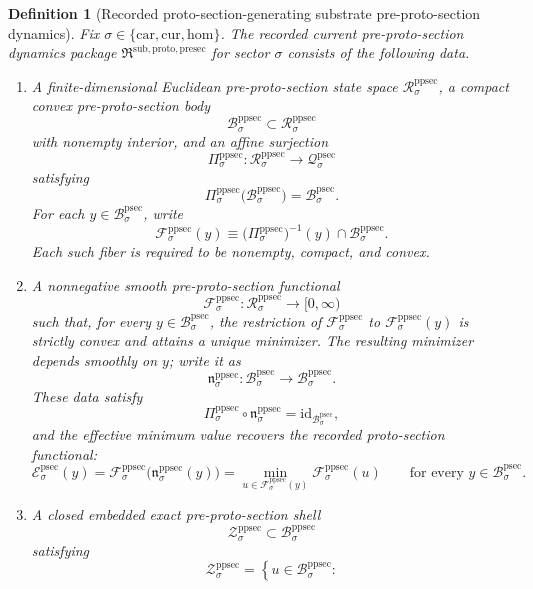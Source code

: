 \documentclass[11pt]{article}
\newcommand{\Car}{\mathrm{car}}
\newcommand{\Cur}{\mathrm{cur}}
\newcommand{\Hom}{\mathrm{hom}}
\newcommand{\ProtoSectionState}[1]{\mathcal Q_{#1}^{\mathrm{psec}}}
\newcommand{\ProtoSectionBody}[1]{\mathcal B_{#1}^{\mathrm{psec}}}
\newcommand{\ProtoSectionFunctional}[1]{\mathscr E_{#1}^{\mathrm{psec}}}
\newcommand{\PreProtoSectionPackage}{\mathfrak R^{\mathrm{sub,proto,presec}}}
\newcommand{\PreProtoSectionState}[1]{\mathcal R_{#1}^{\mathrm{ppsec}}}
\newcommand{\PreProtoSectionBody}[1]{\mathcal B_{#1}^{\mathrm{ppsec}}}
\newcommand{\PreProtoSectionProj}[1]{\Pi_{#1}^{\mathrm{ppsec}}}
\newcommand{\PreProtoSectionFiber}[2]{\mathcal F_{#1}^{\mathrm{ppsec}}(#2)}
\newcommand{\PreProtoSectionProtoMin}[1]{\mathfrak n_{#1}^{\mathrm{ppsec}}}
\newcommand{\PreProtoSectionFunctional}[1]{\mathscr F_{#1}^{\mathrm{ppsec}}}
\newcommand{\PreProtoSectionShell}[1]{\mathcal Z_{#1}^{\mathrm{ppsec}}}
\newtheorem{definition}{Definition}
\begin{document}
\begin{definition}[Recorded proto-section-generating substrate pre-proto-section dynamics]
\label{def:preprotosec}
Fix \(\sigma\in\{\Car,\Cur,\Hom\}\). The recorded current pre-proto-section dynamics package \(\PreProtoSectionPackage\) for sector \(\sigma\) consists of the following data.
\begin{enumerate}
    \item A finite-dimensional Euclidean pre-proto-section state space \(\PreProtoSectionState{\sigma}\), a compact convex pre-proto-section body
    \[
    \PreProtoSectionBody{\sigma}\subset\PreProtoSectionState{\sigma}
    \]
    with nonempty interior, and an affine surjection
    \[
    \PreProtoSectionProj{\sigma}:\PreProtoSectionState{\sigma}\to\ProtoSectionState{\sigma}
    \]
    satisfying
    \[
    \PreProtoSectionProj{\sigma}\bigl(\PreProtoSectionBody{\sigma}\bigr)=\ProtoSectionBody{\sigma}.
    \]
    For each \(y\in\ProtoSectionBody{\sigma}\), write
    \[
    \PreProtoSectionFiber{\sigma}{y}
    \equiv
    \bigl(\PreProtoSectionProj{\sigma}\bigr)^{-1}(y)\cap\PreProtoSectionBody{\sigma}.
    \]
    Each such fiber is required to be nonempty, compact, and convex.
    \item A nonnegative smooth pre-proto-section functional
    \[
    \PreProtoSectionFunctional{\sigma}:\PreProtoSectionState{\sigma}\to[0,\infty)
    \]
    such that, for every \(y\in\ProtoSectionBody{\sigma}\), the restriction of \(\PreProtoSectionFunctional{\sigma}\) to \(\PreProtoSectionFiber{\sigma}{y}\) is strictly convex and attains a unique minimizer. The resulting minimizer depends smoothly on \(y\); write it as
    \[
    \PreProtoSectionProtoMin{\sigma}:\ProtoSectionBody{\sigma}\to\PreProtoSectionBody{\sigma}.
    \]
    These data satisfy
    \[
    \PreProtoSectionProj{\sigma}\circ\PreProtoSectionProtoMin{\sigma}
    =
    \mathrm{id}_{\ProtoSectionBody{\sigma}},
    \]
    and the effective minimum value recovers the recorded proto-section functional:
    \[
    \ProtoSectionFunctional{\sigma}(y)
    =
    \PreProtoSectionFunctional{\sigma}\bigl(\PreProtoSectionProtoMin{\sigma}(y)\bigr)
    =
    \min_{u\in\PreProtoSectionFiber{\sigma}{y}}
    \PreProtoSectionFunctional{\sigma}(u)
    \qquad
    \text{for every }
    y\in\ProtoSectionBody{\sigma}.
    \]
    \item A closed embedded exact pre-proto-section shell
    \[
    \PreProtoSectionShell{\sigma}\subset\PreProtoSectionBody{\sigma}
    \]
    satisfying
    \[
    \PreProtoSectionShell{\sigma}
    =
    \left\{
    u\in\PreProtoSectionBody{\sigma}:
\]
\end{enumerate}
\end{definition}
\end{document}
